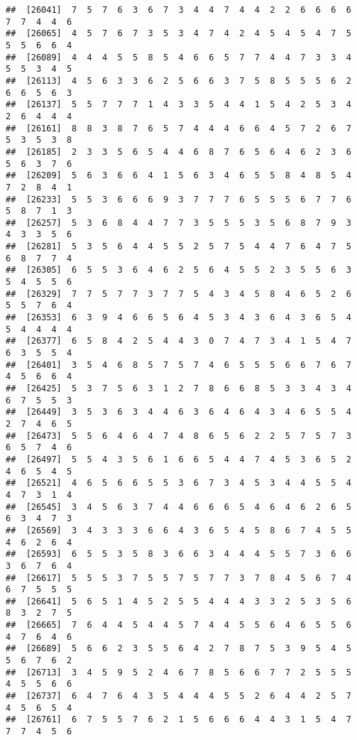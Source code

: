 \documentclass[
]{book}
\begin{document}
\begin{verbatim}
##  [26041]  7  5  7  6  3  6  7  3  4  4  7  4  4  2  2  6  6  6  6  7  7  4  4  6
##  [26065]  4  5  7  6  7  3  5  3  4  7  4  2  4  5  4  5  4  7  5  5  5  6  6  4
##  [26089]  4  4  4  5  5  8  5  4  6  6  5  7  7  4  4  7  3  3  4  5  5  3  4  5
##  [26113]  4  5  6  3  3  6  2  5  6  6  3  7  5  8  5  5  5  6  2  6  6  5  6  3
##  [26137]  5  5  7  7  7  1  4  3  3  5  4  4  1  5  4  2  5  3  4  2  6  4  4  4
##  [26161]  8  8  3  8  7  6  5  7  4  4  4  6  6  4  5  7  2  6  7  5  3  5  3  8
##  [26185]  2  3  3  5  6  5  4  4  6  8  7  6  5  6  4  6  2  3  6  5  6  3  7  6
##  [26209]  5  6  3  6  6  4  1  5  6  3  4  6  5  5  8  4  8  5  4  7  2  8  4  1
##  [26233]  5  5  3  6  6  6  9  3  7  7  7  6  5  5  5  6  7  7  6  5  8  7  1  3
##  [26257]  5  3  6  8  4  4  7  7  3  5  5  5  3  5  6  8  7  9  3  4  3  3  5  6
##  [26281]  5  3  5  6  4  4  5  5  2  5  7  5  4  4  7  6  4  7  5  6  8  7  7  4
##  [26305]  6  5  5  3  6  4  6  2  5  6  4  5  5  2  3  5  5  6  3  5  4  5  5  6
##  [26329]  7  7  5  7  7  3  7  7  5  4  3  4  5  8  4  6  5  2  6  5  5  7  6  4
##  [26353]  6  3  9  4  6  6  5  6  4  5  3  4  3  6  4  3  6  5  4  5  4  4  4  4
##  [26377]  6  5  8  4  2  5  4  4  3  0  7  4  7  3  4  1  5  4  7  6  3  5  5  4
##  [26401]  3  5  4  6  8  5  7  5  7  4  6  5  5  5  6  6  7  6  7  4  5  6  6  4
##  [26425]  5  3  7  5  6  3  1  2  7  8  6  6  8  5  3  3  4  3  4  6  7  5  5  3
##  [26449]  3  5  3  6  3  4  4  6  3  6  4  6  4  3  4  6  5  5  4  2  7  4  6  5
##  [26473]  5  5  6  4  6  4  7  4  8  6  5  6  2  2  5  7  5  7  3  6  5  7  4  6
##  [26497]  5  5  4  3  5  6  1  6  6  5  4  4  7  4  5  3  6  5  2  4  6  5  4  5
##  [26521]  4  6  5  6  6  5  5  3  6  7  3  4  5  3  4  4  5  5  4  4  7  3  1  4
##  [26545]  3  4  5  6  3  7  4  4  6  6  6  5  4  6  4  6  2  6  5  6  3  4  7  3
##  [26569]  3  4  3  3  3  6  6  4  3  6  5  4  5  8  6  7  4  5  5  4  6  2  6  4
##  [26593]  6  5  5  3  5  8  3  6  6  3  4  4  4  5  5  7  3  6  6  3  6  7  6  4
##  [26617]  5  5  5  3  7  5  5  7  5  7  7  3  7  8  4  5  6  7  4  6  7  5  5  5
##  [26641]  5  6  5  1  4  5  2  5  5  4  4  4  3  3  2  5  3  5  6  8  3  2  7  5
##  [26665]  7  6  4  4  5  4  4  5  7  4  4  5  5  6  4  6  5  5  6  4  7  6  4  6
##  [26689]  5  6  6  2  3  5  5  6  4  2  7  8  7  5  3  9  5  4  5  5  6  7  6  2
##  [26713]  3  4  5  9  5  2  4  6  7  8  5  6  6  7  7  2  5  5  5  4  5  5  6  6
##  [26737]  6  4  7  6  4  3  5  4  4  4  5  5  2  6  4  4  2  5  7  4  5  6  5  4
##  [26761]  6  7  5  5  7  6  2  1  5  6  6  6  4  4  3  1  5  4  7  7  7  4  5  6

\end{verbatim}
\end{document}
